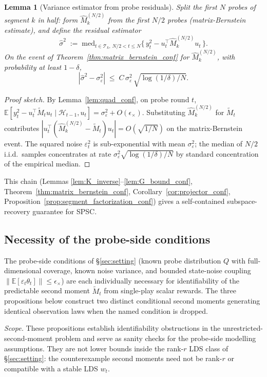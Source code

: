 \documentclass{article}
\newcommand{\E}{\mathbb{E}}
\newcommand{\cH}{\mathcal{H}}
\newcommand{\cT}{\mathcal{T}}
\newtheorem{lemma}{Lemma}
\begin{document}
\begin{lemma}[Variance estimator from probe residuals]
\label{lem:variance_estimator}
Split the first $N$ probes of segment $k$ in half: form
$\widehat M_k^{(N/2)}$ from the first $N/2$ probes (matrix-Bernstein
estimate), and define the residual estimator
\[
\widehat\sigma^2 \;:=\; \mathrm{med}_{t\in\cT_k,\,N/2<t\le N}
  \bigl\{\,y_t^2 - u_t^\top \widehat M_k^{(N/2)} u_t\,\bigr\}.
\]
On the event of Theorem~\ref{thm:matrix_bernstein_conf} for
$\widehat M_k^{(N/2)}$, with probability at least $1-\delta$,
\[
|\widehat\sigma^2 - \sigma_\varepsilon^2|
\;\le\; C\,\sigma_\varepsilon^2\,\sqrt{\log(1/\delta)/N}.
\]
\end{lemma}
\begin{proof}[Proof sketch]
By Lemma~\ref{lem:quad_conf}, on probe round $t$,
$\E[y_t^2-u_t^\top\widetilde M_t u_t\mid\cH_{t-1},u_t]=\sigma_\varepsilon^2
+ O(\epsilon_\times)$. Substituting
$\widehat M_k^{(N/2)}$ for $\widetilde M_t$ contributes
$|u_t^\top(\widehat M_k^{(N/2)}-\widetilde M_t)u_t|=O(\sqrt{1/N})$ on
the matrix-Bernstein event. The squared noise $\varepsilon_t^2$ is
sub-exponential with mean $\sigma_\varepsilon^2$; the median of
$N/2$ i.i.d.\ samples concentrates at rate
$\sigma_\varepsilon^2\sqrt{\log(1/\delta)/N}$ by standard
concentration of the empirical median.
\end{proof}

This chain (Lemmas \ref{lem:K_inverse}--\ref{lem:G_bound_conf},
Theorem~\ref{thm:matrix_bernstein_conf}, Corollary~\ref{cor:projector_conf},
Proposition~\ref{prop:segment_factorization_conf}) gives a
self-contained subspace-recovery guarantee for SPSC.

\subsection{Necessity of the probe-side conditions}
\label{app:necessity}

The probe-side conditions of \S\ref{sec:setting} (known probe
distribution $Q$ with full-dimensional coverage, known noise
variance, and bounded state-noise coupling
$\|\E[\varepsilon_t\theta_t]\|\le\epsilon_\times$) are each
individually necessary for identifiability of the predictable second
moment $\widetilde M_t$ from single-play scalar rewards. The three
propositions below construct two distinct conditional second moments
generating identical observation laws when the named condition is
dropped.

\emph{Scope.} These propositions establish identifiability
obstructions in the unrestricted-second-moment problem and serve as
sanity checks for the probe-side modelling assumptions. They are not
lower bounds inside the rank-$r$ LDS class of \S\ref{sec:setting}:
the counterexample second moments need not be rank-$r$ or compatible
with a stable LDS $w_t$.
\end{document}
